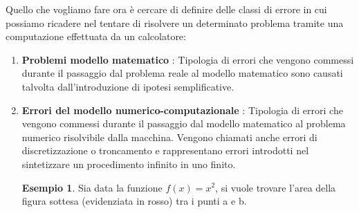 \documentclass[12pt, a4paper]{book}
\theoremstyle{definition}
\newtheorem{exmp}{Esempio}[section]
\begin{document}
\begin{flushleft}

Quello che vogliamo fare ora è cercare di definire delle classi di errore in cui possiamo ricadere nel tentare di risolvere un determinato problema tramite una computazione effettuata da un calcolatore:

\begin{enumerate}
  \item \textbf{Problemi modello matematico} : Tipologia di errori che vengono commessi durante il passaggio dal problema reale al modello matematico sono causati talvolta dall'introduzione di ipotesi semplificative. 
  
  	\begin{figure}[h]
		\centering
	\end{figure}

\item \textbf{Errori del modello numerico-computazionale} : Tipologia di errori che vengono commessi durante il passaggio dal modello matematico al  problema numerico risolvibile dalla macchina. Vengono chiamati anche errori di discretizzazione o troncamento e rappresentano errori introdotti nel sintetizzare un procedimento infinito in uno finito.

\begin{figure}[h!]
		\centering
	\end{figure}
\begin{exmp}
Sia data la funzione $ f(x) = x^2 $, si vuole trovare l'area della figura sottesa (evidenziata in rosso) tra i punti a e b.\\


\end{exmp}
\end{enumerate}
\end{flushleft}
\end{document}
